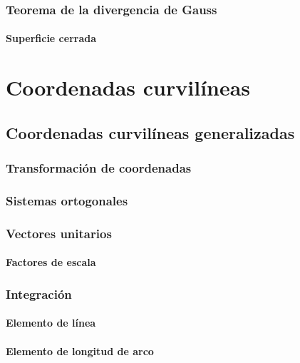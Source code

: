 \documentclass[12pt, fleqn]{report}                             %
\begin{document}
		\section{Teorema de la divergencia de Gauss}
		
			\subsection{Superficie cerrada}


\part{Coordenadas curvilíneas}

	\chapter{Coordenadas curvilíneas generalizadas}
	
		\section{Transformación de coordenadas}
		
		\section{Sistemas ortogonales}
		
		\section{Vectores unitarios}
		
			\subsection{Factores de escala}
		
		\section{Integración}
		
			\subsection{Elemento de línea}
			
			\subsection{Elemento de longitud de arco}
			
\end{document}
